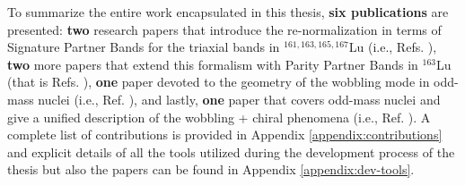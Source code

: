 To summarize the entire work encapsulated in this thesis, \textbf{six publications} are presented: \textbf{two} research papers that introduce the re-normalization in terms of Signature Partner Bands for the triaxial bands in $^{161,163,165,167}$Lu (i.e., Refs. \cite{raduta2020approach,raduta2020towards}), \textbf{two} more papers that extend this formalism with Parity Partner Bands in $^{163}$Lu (that is Refs. \cite{poenaru2021parity,poenaru2021extensive1}), \textbf{one} paper devoted to the geometry of the wobbling mode in odd-mass nuclei (i.e., Ref. \cite{poenaru2021extensive2}), and lastly, \textbf{one} paper that covers odd-mass nuclei and give a unified description of the wobbling + chiral phenomena (i.e., Ref. \cite{raduta2020new}). A complete list of contributions is provided in Appendix \ref{appendix:contributions} and explicit details of all the tools utilized during the development process of the thesis but also the papers can be found in Appendix \ref{appendix:dev-tools}.  
